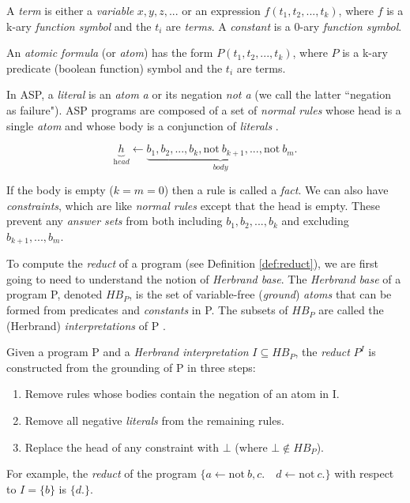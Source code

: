 \begin{definition}
A \textit{term} is either a \textit{variable} $x,y,z,...$ or an expression $f(t_1,t_2,...,t_k)$, where $f$ is a k-ary \textit{function symbol} and the $t_i$ are \textit{terms}. A \textit{constant} is a 0-ary \textit{function symbol}.
\end{definition}

\begin{definition}
An \textit{atomic formula} (or \textit{atom}) has the form $P(t_1,t_2,...,t_k)$, where $P$ is a k-ary predicate (boolean function) symbol and the $t_i$ are terms.
\end{definition}

\noindent
In ASP, a \textit{literal} is an \textit{atom} \textit{a} or its negation \textit{not a} (we call the latter ``negation as failure"). ASP programs are composed of a set of \textit{normal rules} whose head is a single \textit{atom} and whose body is a conjunction of \textit{literals} \cite{law_representing_2019}.

\begin{equation}
\underbrace{h}_{\textit{head}} \leftarrow \underbrace{b_1, b_2, ..., b_k, \text{not}\ b_{k+1}, ..., \text{not}\ b_m}_{\textit{body}}.
\end{equation}

\noindent
If the body is empty ($k = m = 0$) then a rule is called a \textit{fact}. We can also have \textit{constraints}, which are like \textit{normal rules} except that the head is empty. These prevent any \textit{answer sets} from both including $b_1, b_2, ..., b_k$ and excluding $b_{k+1}, ..., b_m$.

To compute the \textit{reduct} of a program (see Definition \ref{def:reduct}), we are first going to need to understand the notion of \textit{Herbrand base}. The \textit{Herbrand base} of a program P, denoted $HB_P$, is the set of variable-free (\textit{ground}) \textit{atoms} that can be formed from predicates and \textit{constants} in P. The subsets of $HB_P$ are called the (Herbrand) \textit{interpretations} of P \cite{law_representing_2019}.

\begin{definition}
\label{def:reduct}
Given a program P and a \textit{Herbrand interpretation} $I \subseteq HB_P$, the \textit{reduct} $P^I$ is constructed from the grounding of P in three steps:
\begin{enumerate}[nolistsep]
\item Remove rules whose bodies contain the negation of an atom in I.
\item Remove all negative \textit{literals} from the remaining rules.
\item Replace the head of any constraint with $\bot$ (where $\bot \notin HB_P$).
\end{enumerate}
For example, the \textit{reduct} of the program $\{a \leftarrow \text{not}\ b, c.\quad d \leftarrow \text{not}\ c.\}$ with respect to $I=\{b\}$ is $\{d.\}$.
\end{definition}

